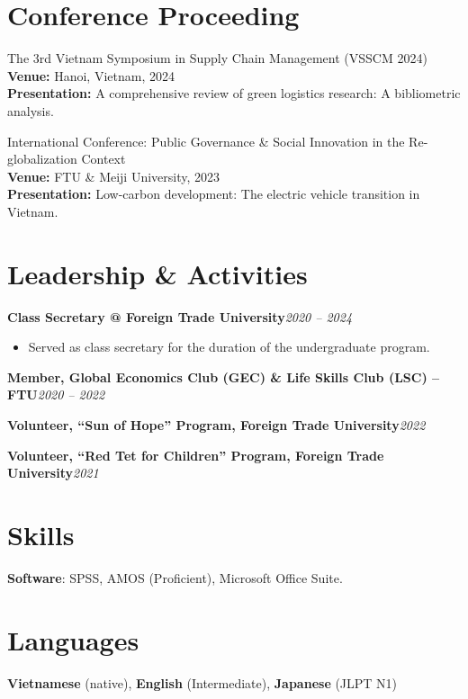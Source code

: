 \documentclass[10.5pt]{article}
\begin{document}

\section{Conference Proceeding}

\begin{enumerate}[label={[\arabic*]}]
\item The 3rd Vietnam Symposium in Supply Chain Management (VSSCM 2024) \\
	\textbf{Venue:} Hanoi, Vietnam, 2024 \\
	\textbf{Presentation:} A comprehensive review of green logistics research: A bibliometric analysis.
\item International Conference: Public Governance \& Social Innovation in the Re-globalization Context \\
	\textbf{Venue:} FTU \& Meiji University, 2023 \\
	\textbf{Presentation:} Low-carbon development: The electric vehicle transition in Vietnam.
\end{enumerate}

\section{Leadership \& Activities}
\textbf{Class Secretary @ Foreign Trade University}\hfill \emph{2020 -- 2024}
\vspace{-0.5em}
\begin{itemize}
    \item Served as class secretary for the duration of the undergraduate program.
\end{itemize}
\vspace{-0.3em}
\textbf{Member, Global Economics Club (GEC) \& Life Skills Club (LSC) -- FTU}\hfill \emph{2020 -- 2022}

\textbf{Volunteer, ``Sun of Hope'' Program, Foreign Trade University}\hfill \emph{2022}

\textbf{Volunteer, ``Red Tet for Children'' Program, Foreign Trade University}\hfill \emph{2021}

\section{Skills}

\textbf{Software}: SPSS, AMOS (Proficient), Microsoft Office Suite.


\section{Languages}

\textbf{Vietnamese} (native), \textbf{English} (Intermediate), \textbf{Japanese} (JLPT N1)
\end{document}
